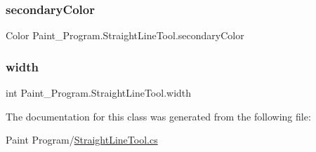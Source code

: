 \subsubsection{\texorpdfstring{secondary\+Color}{secondaryColor}}
{\footnotesize\ttfamily Color Paint\+\_\+\+Program.\+Straight\+Line\+Tool.\+secondary\+Color\hspace{0.3cm}{\ttfamily [private]}}

\mbox{\label{class_paint___program_1_1_straight_line_tool_a5028852803a8d10f33cce71589b30a2c}} 
\subsubsection{\texorpdfstring{width}{width}}
{\footnotesize\ttfamily int Paint\+\_\+\+Program.\+Straight\+Line\+Tool.\+width\hspace{0.3cm}{\ttfamily [private]}}



The documentation for this class was generated from the following file\+:\begin{DoxyCompactItemize}
\item 
Paint Program/\mbox{\hyperlink{_straight_line_tool_8cs}{Straight\+Line\+Tool.\+cs}}\end{DoxyCompactItemize}
